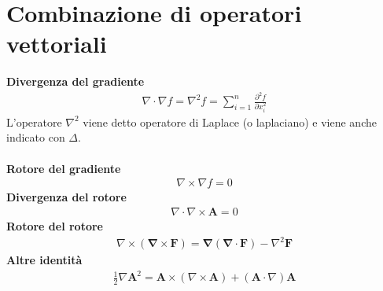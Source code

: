 \documentclass[10pt,a4paper]{book}
\begin{document}
\section{Combinazione di operatori vettoriali}

\textbf{Divergenza del gradiente}
\begin{align*}
	\nabla \cdot \nabla f = \nabla^2 f   = \sum_{i=1}^n \frac {\partial^2f}{\partial x^2_i}
\end{align*}
L'operatore $ \nabla^2$ viene detto operatore di Laplace (o laplaciano) e viene anche indicato con $ \Delta $. \\\\
\textbf{Rotore del gradiente}
\begin{align*}
	\nabla \times \nabla f = 0
\end{align*}
\textbf{Divergenza del rotore}
\begin{align*}
	\nabla \cdot \nabla \times \mathbf{A} = 0
\end{align*}
\textbf{Rotore del rotore}
\begin{align*}
	\nabla \times \left( \mathbf{\nabla \times F} \right) = \mathbf{\nabla} (\mathbf{\nabla \cdot F}) - \nabla^2 \mathbf{F}
\end{align*}
\textbf{Altre identità}
\begin{align*}
	\frac{1}{2} \nabla \mathbf{A}^2 = \mathbf{A} \times (\nabla \times \mathbf{A}) + (\mathbf{A} \cdot \nabla) \mathbf{A}
\end{align*}
\end{document}
